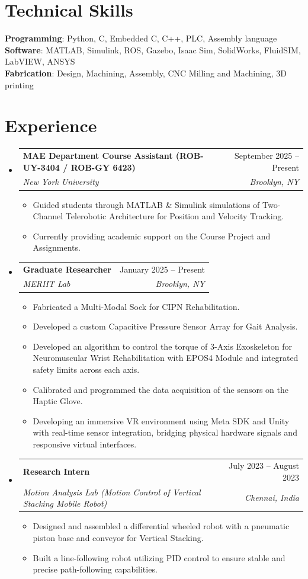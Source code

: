 \documentclass[a4paper,10pt]{article}
\makeatletter
\newcommand{\resumeItem}[1]{
  \item\small{
    {#1 \vspace{-2pt}}
  }
}
\newcommand{\resumeSubheading}[4]{
  \vspace{-1pt}\item
    \begin{tabular*}{0.97\textwidth}[t]{l@{\extracolsep{\fill}}r}
      \textbf{#1} & #2 \\
      \textit{\small#3} & \textit{\small #4} \\
    \end{tabular*}\vspace{-5pt}
}
\makeatother
\begin{document}
\section{Technical Skills}
 \begin{itemize}[leftmargin=0.15in, label={}]
    \small{\item{
     \textbf{Programming}{: Python, C, Embedded C, C++, PLC, Assembly language} \\
     \textbf{Software}{: MATLAB, Simulink, ROS, Gazebo, Isaac Sim, SolidWorks, FluidSIM, LabVIEW, ANSYS} \\
     \textbf{Fabrication}{: Design, Machining, Assembly, CNC Milling and Machining, 3D printing}
    }}
 \end{itemize}


\section{Experience}
  \begin{itemize}[leftmargin=0.15in, label={}]

    \resumeSubheading
      {MAE Department Course Assistant (ROB-UY-3404 / ROB-GY 6423)}{September 2025 -- Present}
      {New York University}{Brooklyn, NY}
      \begin{itemize}
        \resumeItem{Guided students through MATLAB \& Simulink simulations of Two-Channel Telerobotic Architecture for Position and Velocity Tracking.}
        \resumeItem{Currently providing academic support on the Course Project and Assignments.}
      \end{itemize}

    \resumeSubheading
      {Graduate Researcher}{January 2025 -- Present}
      {MERIIT Lab}{Brooklyn, NY}
      \begin{itemize}
        \resumeItem{Fabricated a Multi-Modal Sock for CIPN Rehabilitation.}
        \resumeItem{Developed a custom Capacitive Pressure Sensor Array for Gait Analysis.}
        \resumeItem{Developed an algorithm to control the torque of 3-Axis Exoskeleton for Neuromuscular Wrist Rehabilitation with EPOS4 Module and integrated safety limits across each axis.}
        \resumeItem{Calibrated and programmed the data acquisition of the sensors on the Haptic Glove.}
        \resumeItem{Developing an immersive VR environment using Meta SDK and Unity with real-time sensor integration, bridging physical hardware signals and responsive virtual interfaces.}
      \end{itemize}

    \resumeSubheading
      {Research Intern}{July 2023 -- August 2023}
      {Motion Analysis Lab (Motion Control of Vertical Stacking Mobile Robot)}{Chennai, India}
      \begin{itemize}
        \resumeItem{Designed and assembled a differential wheeled robot with a pneumatic piston base and conveyor for Vertical Stacking.}
        \resumeItem{Built a line-following robot utilizing PID control to ensure stable and precise path-following capabilities.}
      \end{itemize}

  \end{itemize}
\end{document}
